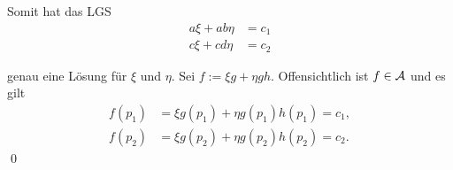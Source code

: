 \begin{frame}
    Somit hat das LGS 
    \begin{align*}
        a \xi + ab \eta &= c_1 \\
        c \xi + cd \eta &= c_2
    \end{align*}

    genau eine Lösung für \( \xi \) und \( \eta \). 
    \pause
    Sei \( f := \xi g + \eta g h \). Offensichtlich ist \( f \in \mathcal{A} \) und es gilt 
    \begin{align*}
        f(p_1) &= \xi g(p_1) + \eta g(p_1) h(p_1) = c_1, \\
        f(p_2) &= \xi g(p_2) + \eta g(p_2) h(p_2) = c_2.
    \end{align*}
    \qed
\end{frame}
